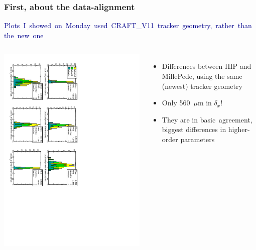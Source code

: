 \documentclass[compress]{beamer}
\begin{document}
\begin{frame}
\frametitle{First, about the data-alignment}
\scriptsize

\vspace{0.25 cm}
\mbox{\textcolor{darkblue}{Plots I showed on Monday used CRAFT\_V11 tracker geometry, rather than the new one}\hspace{-1 cm}}

\vfill
\begin{columns}
\includegraphics[height=\linewidth, angle=90]{hip_millepede_difference.pdf}
\begin{itemize}
\item Differences between HIP and MillePede, using the same (newest) tracker geometry
\item Only 560~$\mu$m in $\delta_x$!
\item They are in \mbox{basic agreement,\hspace{-0.5 cm}} biggest differences in higher-order parameters
\end{itemize}
\vspace{0.25 cm}
\end{columns}


\end{frame}
\end{document}

